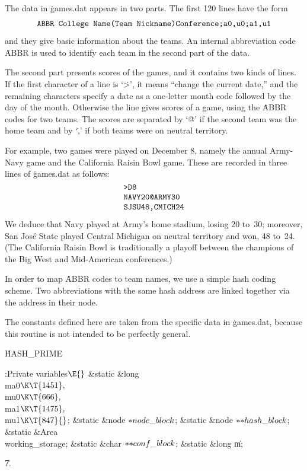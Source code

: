 The data in \.{games.dat} appears in two parts. The first 120 lines
have the form
$$\hbox{\tt ABBR College Name(Team Nickname)Conference;a0,u0;a1,u1}$$
and they give basic information about the teams. An internal abbreviation code
\.{ABBR} is used to identify each team in the second part of the data.

The second part presents scores of the games, and it
contains two kinds of lines. If the first character of a line is
`\.>', it means ``change the current date,'' and the remaining
characters specify a date as a one-letter month code followed by the day
of the month. Otherwise the line gives scores of a game, using the
\.{ABBR} codes for two teams. The scores are separated by `\.@' if
the second team was the home team and by `\.,' if both teams were on
neutral territory.

For example, two games were played on December 8, namely the annual Army-Navy
game and the California Raisin Bowl game. These are recorded in three lines
of \.{games.dat} as follows:
$$\vbox{\halign{\tt#\hfil\cr
>D8\cr
NAVY20@ARMY30\cr
SJSU48,CMICH24\cr}}$$
We deduce that Navy played at Army's home stadium, losing 20 to~30;
moreover, San Jos\'e State played Central Michigan on neutral territory and
won, 48 to~24. (The California Raisin Bowl is traditionally a playoff between
the champions of the Big West and Mid-American conferences.)

\fi

In order to map \.{ABBR} codes to team names, we use a simple
hash coding scheme. Two abbreviations with the same hash address are
linked together via the  address in their node.

The constants defined here are taken from the specific data in \.{games.dat},
because this routine is not intended to be perfectly general.

\Y\B\4\D\.{HASH\_PRIME}\5
\par
\Y\B\4:Private variables\X${}\E{}$\6
\&{static} \&{long} \\{ma0}${}\K\T{1451},{}$ \\{mu0}${}\K\T{666},{}$ \\{ma1}${}%
\K\T{1475},{}$ \\{mu1}${}\K\T{847}{}$;\6
\&{static} \&{node} ${}{*}\\{node\_block}{}$;\6
\&{static} \&{node} ${}{*}{*}\\{hash\_block}{}$;\6
\&{static} \&{Area} \\{working\_storage};\6
\&{static} \&{char} ${}{*}{*}\\{conf\_block}{}$;%
\6
\&{static} \&{long} \|m;\par
\U7.\fi

